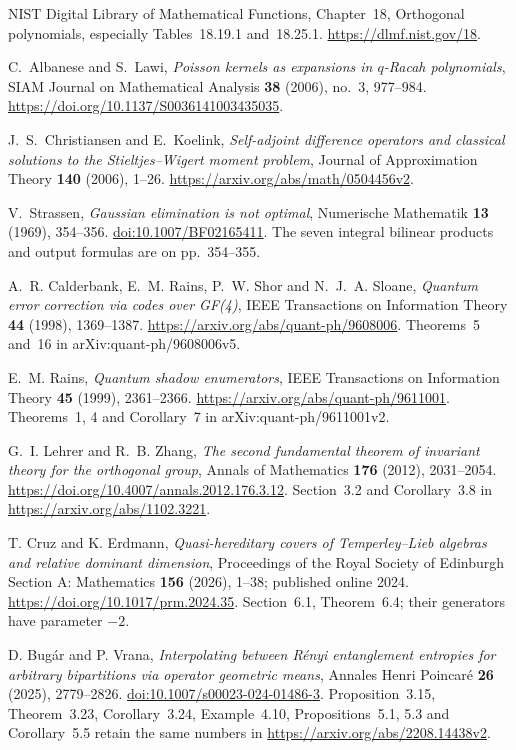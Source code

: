 NIST Digital Library of Mathematical Functions,
Chapter~18, Orthogonal polynomials, especially Tables~18.19.1 and~18.25.1.
\url{https://dlmf.nist.gov/18}.


C.~Albanese and S.~Lawi,
\emph{Poisson kernels as expansions in $q$-Racah polynomials},
SIAM Journal on Mathematical Analysis \textbf{38} (2006), no.~3, 977--984.
\url{https://doi.org/10.1137/S0036141003435035}.


J.~S.~Christiansen and E.~Koelink,
\emph{Self-adjoint difference operators and classical solutions to the Stieltjes--Wigert moment problem},
Journal of Approximation Theory \textbf{140} (2006), 1--26.
\url{https://arxiv.org/abs/math/0504456v2}.

V.~Strassen, \emph{Gaussian elimination is not optimal},
Numerische Mathematik \textbf{13} (1969), 354--356.
\href{https://doi.org/10.1007/BF02165411}{doi:10.1007/BF02165411}.
The seven integral bilinear products and output formulas are on pp.~354--355.

A.~R. Calderbank, E.~M. Rains, P.~W. Shor and N.~J.~A. Sloane,
\emph{Quantum error correction via codes over GF(4)},
IEEE Transactions on Information Theory \textbf{44} (1998), 1369--1387.
\url{https://arxiv.org/abs/quant-ph/9608006}.
Theorems~5 and~16 in arXiv:quant-ph/9608006v5.

E.~M. Rains, \emph{Quantum shadow enumerators},
IEEE Transactions on Information Theory \textbf{45} (1999), 2361--2366.
\url{https://arxiv.org/abs/quant-ph/9611001}.
Theorems~1, 4 and Corollary~7 in arXiv:quant-ph/9611001v2.

G.~I. Lehrer and R.~B. Zhang,
\emph{The second fundamental theorem of invariant theory for the orthogonal group},
Annals of Mathematics \textbf{176} (2012), 2031--2054.
\url{https://doi.org/10.4007/annals.2012.176.3.12}.
Section~3.2 and Corollary~3.8 in \url{https://arxiv.org/abs/1102.3221}.

T. Cruz and K. Erdmann,
\emph{Quasi-hereditary covers of Temperley--Lieb algebras and relative dominant dimension},
Proceedings of the Royal Society of Edinburgh Section A: Mathematics
\textbf{156} (2026), 1--38; published online 2024.
\url{https://doi.org/10.1017/prm.2024.35}.
Section~6.1, Theorem~6.4; their generators have parameter $-2$.

D. Bug\'ar and P. Vrana,
\emph{Interpolating between R\'enyi entanglement entropies for arbitrary
bipartitions via operator geometric means},
Annales Henri Poincar\'e \textbf{26} (2025), 2779--2826.
\href{https://doi.org/10.1007/s00023-024-01486-3}{doi:10.1007/s00023-024-01486-3}.
Proposition~3.15, Theorem~3.23, Corollary~3.24, Example~4.10,
Propositions~5.1, 5.3 and Corollary~5.5 retain the same numbers in
\url{https://arxiv.org/abs/2208.14438v2}.

